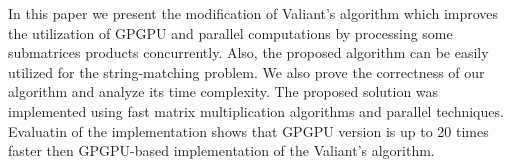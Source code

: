 In this paper we present the modification of Valiant's algorithm which improves the utilization of GPGPU and parallel computations by processing some submatrices products concurrently.
Also, the proposed algorithm can be easily utilized for the string-matching problem.
We also prove the correctness of our algorithm and analyze its time complexity.
The proposed solution was implemented using fast matrix multiplication algorithms and parallel techniques. Evaluatin of the implementation shows that GPGPU version is up to 20 times faster then GPGPU-based implementation of the Valiant's algorithm.

